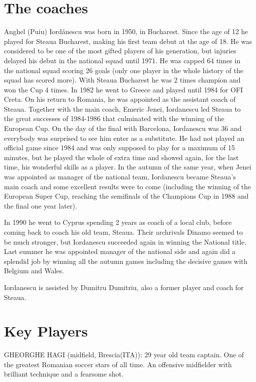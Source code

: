 \section{The coaches}
Anghel (Puiu) Iord\v{a}nescu was born in 1950, in Bucharest. Since the age of 12 he
played for Steaua Bucharest, making his first team debut at the age of 18. He 
was considered to be one of the most gifted players of his generation, but 
injuries delayed his debut in the national squad until 1971. He was capped 64
times in the national squad scoring 26 goals (only one player in the whole
history of the squad has scored more). With Steaua Bucharest he was 2 times 
champion and won the Cup 4 times. In 1982 he went to Greece and played until 
1984 for OFI Creta.  On his return to Romania, he was appointed as the 
assistant coach of Steaua. Together with the main coach, Emeric Jenei, 
Iordanescu led Steaua to the great successes of 1984-1986 that culminated with
the  winning  of  the European Cup. On the day of the final with Barcelona,  
Iordanescu was 36 and everybody was surprised to see him enter as a substitute.
He had not played an official game since 1984 and was only supposed to play 
for a maximum of 15 minutes,  but he played the whole of extra time and showed
again, for the last time, his wonderful skills as a player. In the autumn of 
the same year, when Jenei was appointed as manager of the national team, 
Iordanescu became Steaua's main coach and some excellent results were to come
(including the winning of the European Super Cup, reaching the semifinals of 
the Champions Cup in 1988 and the final one year later).

In 1990 he went to Cyprus spending 2 years as coach of a local club, before 
coming back to coach his old team, Steaua. Their archrivals Dinamo seemed to be
much stronger, but Iordanescu succeeded again in winning the National title.  
Last summer he was appointed manager of the national side and again did a  
splendid job by winning all the autumn games including the decisive games with
Belgium and Wales.

Iordanescu is assisted by Dumitru Dumitriu, also a former player and coach for
Steaua.

\section{Key Players}
GHEORGHE HAGI (midfield, Brescia(ITA)):
29 year old team captain. One of the greatest Romanian soccer stars of all 
time. An offensive midfielder with brilliant technique and a fearsome shot.

